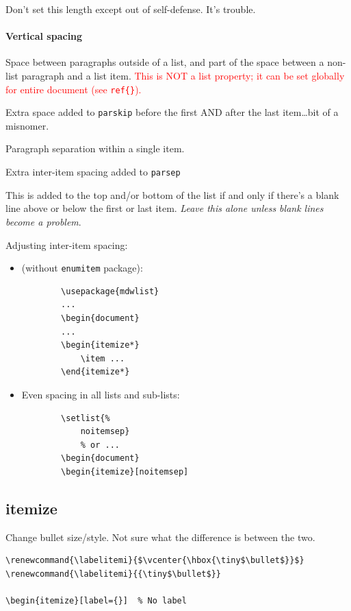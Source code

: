 \documentclass{article}
\renewcommand{\labelitemi}{$\vcenter{\hbox{\tiny$\bullet$}}$}
\begin{document}
\begin{description}[labelindent=2cm, leftmargin=\labelindent,
        ]
        Don't set this length except out of self-defense. It's trouble.
\end{description}
\paragraph{Vertical spacing}
\begin{description}[labelindent=2cm, leftmargin=\labelindent]
    \item [parskip] Space between paragraphs outside of a list, and part of
        the space between a non-list paragraph and a list item.
        \textcolor{red}{This is NOT a list property; it can be set
        globally for entire document (see \SS{} \texttt{ref\{\}}).}
    \item [topsep] Extra space added to \texttt{parskip} before the first
        AND after the last item\ldots bit of a misnomer.
    \item [parsep] Paragraph separation within a single item.
    \item [itemsep] Extra inter-item spacing added to \texttt{parsep}
    \item [partopsep] This is added to the top and/or bottom of the list
        if and only if there's a blank line above or below the first
        or last item. \emph{Leave this alone unless blank lines become a
        problem}.
\end{description}
Adjusting inter-item spacing:
\begin{itemize}
    \item (without \texttt{enumitem} package):
        \begin{lstlisting}
        \usepackage{mdwlist}
        ...
        \begin{document}
        ...
        \begin{itemize*}
            \item ...
        \end{itemize*}
        \end{lstlisting}
    \item Even spacing in all lists and sub-lists:
        \begin{lstlisting}
        \setlist{%
            noitemsep}
            % or ...
        \begin{document}
        \begin{itemize}[noitemsep]
        \end{lstlisting}
\end{itemize}

\subsection{itemize}
Change bullet size/style. Not sure what the difference is between the two.
\begin{lstlisting}
\renewcommand{\labelitemi}{$\vcenter{\hbox{\tiny$\bullet$}}$}
\renewcommand{\labelitemi}{{\tiny$\bullet$}}

\begin{itemize}[label={}]  % No label
\end{lstlisting}
\end{document}
